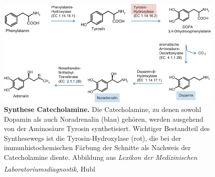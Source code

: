 \begin{figure}[H]
    \centering
    \includegraphics[width=\textwidth]{pictures/Bilder_monoamine_systeme/Synethese_Katecholamine.png}
    \caption[Synthese Catecholamine]{\textbf{Synthese Catecholamine.} Die Catecholamine, zu denen sowohl Dopamin als auch Noradrenalin (blau) gehören, werden ausgehend von der Aminosäure Tyrosin synthetisiert. Wichtiger Bestandteil des Synthesewegs ist die Tyrosin-Hydroxylase (rot), die bei der immunhistochemischen Färbung der Schnitte als Nachweis der Catecholamine diente.
    Abbildung aus \textit{Lexikon der Medizinischen Laboratoriumsdiagnostik}, Hubl \textsuperscript{\cite{Hubl2019}}}
    \label{fig:synthese_catecholamine}
\end{figure}{}
